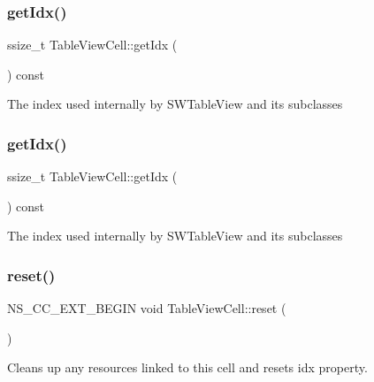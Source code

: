 \subsubsection{\texorpdfstring{get\+Idx()}{getIdx()}\hspace{0.1cm}{\footnotesize\ttfamily [1/2]}}
{\footnotesize\ttfamily ssize\+\_\+t Table\+View\+Cell\+::get\+Idx (\begin{DoxyParamCaption}{ }\end{DoxyParamCaption}) const}

The index used internally by S\+W\+Table\+View and its subclasses \mbox{\label{classTableViewCell_af8d8629559291a8d08cf93bd544d184b}} 
\subsubsection{\texorpdfstring{get\+Idx()}{getIdx()}\hspace{0.1cm}{\footnotesize\ttfamily [2/2]}}
{\footnotesize\ttfamily ssize\+\_\+t Table\+View\+Cell\+::get\+Idx (\begin{DoxyParamCaption}{ }\end{DoxyParamCaption}) const}

The index used internally by S\+W\+Table\+View and its subclasses \mbox{\label{classTableViewCell_a371f91eea4a4355219335c8895905ffd}} 
\subsubsection{\texorpdfstring{reset()}{reset()}\hspace{0.1cm}{\footnotesize\ttfamily [1/2]}}
{\footnotesize\ttfamily N\+S\+\_\+\+C\+C\+\_\+\+E\+X\+T\+\_\+\+B\+E\+G\+IN void Table\+View\+Cell\+::reset (\begin{DoxyParamCaption}{ }\end{DoxyParamCaption})}

Cleans up any resources linked to this cell and resets {\ttfamily idx} property. \mbox{\label{classTableViewCell_a55e25c8553f7fc98b3e6d26bfd01fb4c}} 
